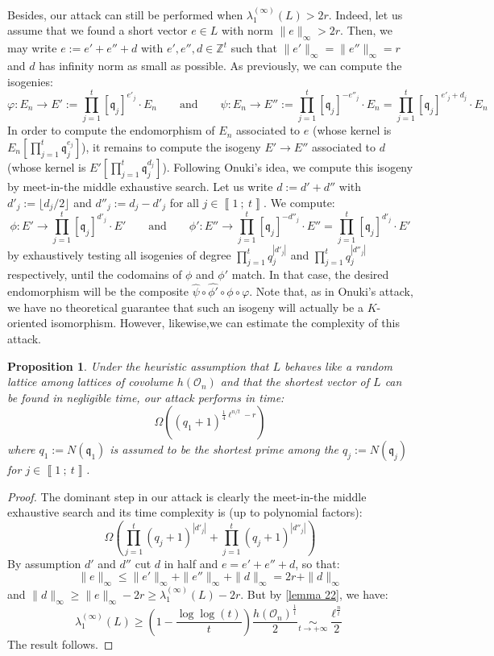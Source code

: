 \documentclass[a4paper,10pt]{report}
\theoremstyle{definition}
\theoremstyle{plain}
\newtheorem{proposition}[definition]{Proposition}
\theoremstyle{definition}
\newcommand{\Z}{\mathbb{Z}}
\newcommand{\mO}{\mathcal{O}}
\renewcommand{\i}[2]{\left\llbracket #1~;~#2\right\rrbracket}
\renewcommand{\(}{\left(}
\renewcommand{\)}{\right)}
\newcommand{\mf}[1]{\mathfrak{#1}}
\begin{document}
Besides, our attack can still be performed when $\lambda_1^{(\infty)}(L)>2r$. Indeed, let us assume that we found a short vector $e\in L$ with norm $\|e\|_\infty>2r$. Then, we may write $e:=e'+e''+d$ with $e', e'', d\in\Z^t$ such that $\|e'\|_\infty=\|e''\|_\infty=r$ and $d$ has infinity norm as small as possible. As previously, we can compute the isogenies:
\[\varphi : E_n \longrightarrow E':=\prod_{j=1}^t[\mf{q}_j]^{e'_j}\cdot E_n \qquad \mbox{and} \qquad \psi : E_n  \longrightarrow  E'':=\prod_{j=1}^t[\mf{q}_j]^{-e''_j}\cdot E_n=\prod_{j=1}^t[\mf{q}_j]^{e'_j+d_j}\cdot E_n\]
In order to compute the endomorphism of $E_n$ associated to $e$ (whose kernel is $E_n[\prod_{j=1}^t \mf{q}_j^{e_j}]$), it remains to compute the isogeny $E'\longrightarrow E''$ associated to $d$ (whose kernel is $E'[\prod_{j=1}^t\mf{q}_j^{d_j}]$). Following Onuki's idea, we compute this isogeny by meet-in-the middle exhaustive search. Let us write $d:=d'+d''$ with $d'_j:=\lfloor d_j/2\rfloor$ and $d''_j:=d_j-d'_j$ for all $j\in\i{1}{t}$. We compute:
\[\phi: E'\longrightarrow \prod_{j=1}^t [\mf{q}_j]^{d'_j}\cdot E' \qquad \mbox{and} \qquad \phi': E''\longrightarrow \prod_{j=1}^t [\mf{q}_j]^{-d''_j}\cdot E''=\prod_{j=1}^t [\mf{q}_j]^{d'_j}\cdot E'\]
by exhaustively testing all isogenies of degree $\prod_{j=1}^t q_j^{|d'_j|}$ and $\prod_{j=1}^t q_j^{|d''_j|}$ respectively, until the codomains of $\phi$ and $\phi'$ match. In that case, the desired endomorphism will be the composite $\widehat{\psi}\circ\widehat{\phi'}\circ\phi\circ\varphi$. Note that, as in Onuki's attack, we have no theoretical guarantee that such an isogeny will actually be a $K$-oriented isomorphism. However, likewise,we can estimate the complexity of this attack.

\begin{proposition}
Under the heuristic assumption that $L$ behaves like a random lattice among lattices of covolume $h(\mO_n)$ and that the shortest vector of $L$ can be found in negligible time, our attack performs in time:
\[\Omega\((q_1+1)^{\frac{1}{4}\ell^{n/t}-r}\)\]
where $q_1:=N(\mf{q}_1)$ is assumed to be the shortest prime among the $q_j:=N(\mf{q}_j)$ for $j\in\i{1}{t}$.
\end{proposition} 

\begin{proof}
The dominant step in our attack is clearly the meet-in-the middle exhaustive search and its time complexity is (up to polynomial factors):
\[\Omega\(\prod_{j=1}^t (q_j+1)^{|d'_j|}+\prod_{j=1}^t (q_j+1)^{|d''_j|}\)\]
By assumption $d'$ and $d''$ cut $d$ in half and $e=e'+e''+d$, so that:
\[\|e\|_\infty\leq \|e'\|_\infty+\|e''\|_\infty+\|d\|_\infty=2r+\|d\|_\infty\]
and $\|d\|_\infty\geq \|e\|_\infty-2r\geq \lambda_1^{(\infty)}(L)-2r$.  But by \ref{lemma 22}, we have:
\[\lambda_1^{(\infty)}(L)\geq \(1-\frac{\log\log(t)}{t}\)\frac{h(\mO_n)^{\frac{1}{t}}}{2}\underset{t\rightarrow +\infty}{\sim}\frac{\ell^{\frac{n}{t}}}{2}\]
The result follows.
\end{proof}
\end{document}
